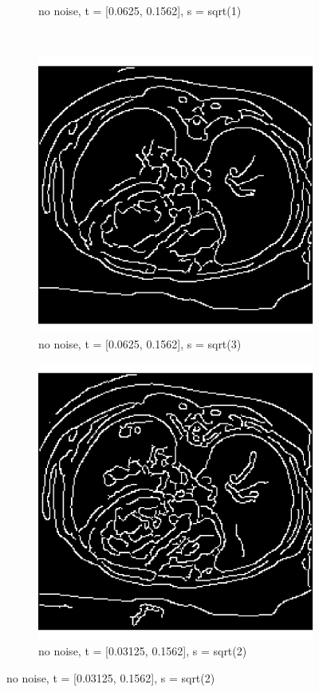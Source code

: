 \begin{figure}[H]
\begin{subfigure}{.5\textwidth}
    \caption{no noise, t = [0.0625, 0.1562], s = sqrt(1)}
    \label{fig:cany_no_noise_low_s}
  \end{subfigure}\\%
  \begin{subfigure}{.5\textwidth}
    \centering
    \includegraphics[width=.9\textwidth]{./canny1/no_noise_s_srt_3}
    \caption{no noise, t = [0.0625, 0.1562], s = sqrt(3)}
    \label{fig:cany_no_noise_high_s}
  \end{subfigure}%
  \begin{subfigure}{.5\textwidth}
    \centering
    \includegraphics[width=.9\textwidth]{./canny1/no_noise_t_003125_01562}
    \caption{no noise, t = [0.03125, 0.1562], s = sqrt(2)}
    \label{fig:cany_no_noise_low_low_t}
  \end{subfigure}%
  
\end{figure}

